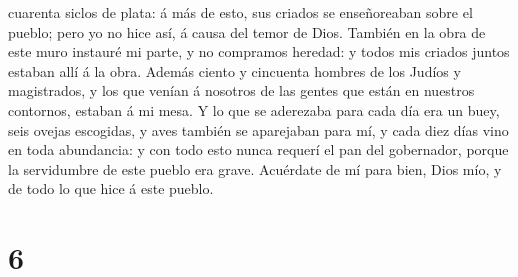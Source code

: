 cuarenta siclos de plata: á más de esto, sus criados se enseñoreaban
sobre el pueblo; pero yo no hice así, á causa del temor de Dios.
 También en la obra de este muro instauré mi parte, y no
compramos heredad: y todos mis criados juntos estaban allí á la obra.
 Además ciento y cincuenta hombres de los Judíos y
magistrados, y los que venían á nosotros de las gentes que están en
nuestros contornos, estaban á mi mesa.  Y lo que se
aderezaba para cada día era un buey, seis ovejas escogidas, y aves
también se aparejaban para mí, y cada diez días vino en toda abundancia:
y con todo esto nunca requerí el pan del gobernador, porque la
servidumbre de este pueblo era grave.  Acuérdate de mí para
bien, Dios mío, y de todo lo que hice á este pueblo.

\hypertarget{section-5}{%
\section{6}\label{section-5}}

